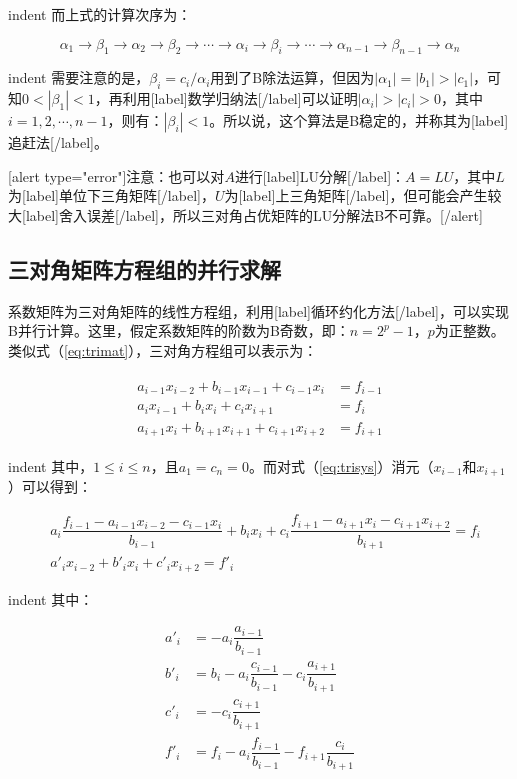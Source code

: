 \documentclass[UTF8,nofonts]{ctexart}
\begin{document}
indent 而上式的计算次序为：

\[
\alpha_1\rightarrow\beta_1\rightarrow\alpha_2\rightarrow\beta_2\rightarrow\cdots\rightarrow\alpha_i\rightarrow\beta_i\rightarrow\cdots\rightarrow\alpha_{n-1}\rightarrow\beta_{n-1}\rightarrow\alpha_n
\]

indent 需要注意的是，$\beta_i=c_i/\alpha_i$用到了B除法运算，但因为$|\alpha_1|=|b_1|>|c_1|$，可知$0<|\beta_1|<1$，再利用[label]数学归纳法[/label]可以证明$|\alpha_i|>|c_i|>0$，其中$i=1,2,\cdots,n-1$，则有：$|\beta_i|<1$。所以说，这个算法是B稳定的，并称其为[label]追赶法[/label]。

[alert type="error"]注意：也可以对$A$进行[label]LU分解[/label]：$A=LU$，其中$L$为[label]单位下三角矩阵[/label]，$U$为[label]上三角矩阵[/label]，但可能会产生较大[label]舍入误差[/label]，所以三对角占优矩阵的LU分解法B不可靠。[/alert]

\subsection*{三对角矩阵方程组的并行求解}

系数矩阵为三对角矩阵的线性方程组，利用[label]循环约化方法[/label]，可以实现B并行计算。这里，假定系数矩阵的阶数为B奇数，即：$n=2^p-1$，$p$为正整数。类似式（\ref{eq:trimat}），三对角方程组可以表示为：

\begin{align}
\label{eq:trisys}
\begin{split}
a_{i-1}x_{i-2}+b_{i-1}x_{i-1}+c_{i-1}x_{i} &= f_{i-1} \\
a_ix_{i-1}+b_ix_i+c_ix_{i+1} &= f_i \\
a_{i+1}x_{i}+b_{i+1}x_{i+1}+c_{i+1}x_{i+2} &= f_{i+1}
\end{split}
\end{align}

indent 其中，$1 \leq i \leq n$，且$a_1=c_n=0$。而对式（\ref{eq:trisys}）消元（$x_{i-1}$和$x_{i+1}$）可以得到：

\begin{eqnarray*}
& a_i\dfrac{f_{i-1}-a_{i-1}x_{i-2}-c_{i-1}x_i}{b_{i-1}}+b_ix_i+c_i\dfrac{f_{i+1}-a_{i+1}x_i-c_{i+1}x_{i+2}}{b_{i+1}}=f_i \\
& a'_ix_{i-2}+b'_ix_i+c'_ix_{i+2}=f'_i
\end{eqnarray*}

indent 其中：

\begin{align*}
a'_i &= -a_i\dfrac{a_{i-1}}{b_{i-1}} \\
b'_i &= b_i-a_i\dfrac{c_{i-1}}{b_{i-1}}-c_i\dfrac{a_{i+1}}{b_{i+1}} \\
c'_i &= -c_i\dfrac{c_{i+1}}{b_{i+1}} \\
f'_i &= f_i-a_i\dfrac{f_{i-1}}{b_{i-1}}-f_{i+1}\dfrac{c_i}{b_{i+1}}
\end{align*}
\end{document}
